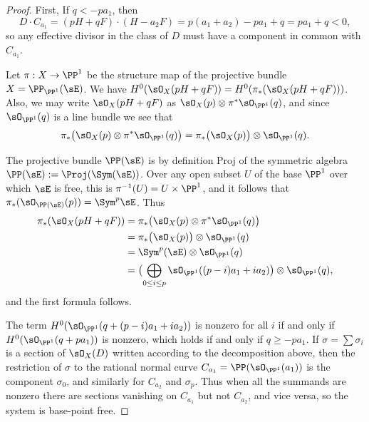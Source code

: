 \begin{proof} First, If $q<-pa_{1}$, then 
$$
D\cdot C_{a_{1}} = (pH+qF) \cdot (H-a_{2}F) = p(a_{1}+a_{2}) -pa_{1}+q = pa_{1}+q < 0,
$$
so any effective divisor in the class of $D$ must have a component in common with $C_{a_{1}}$.

Let $\pi:X\to \PP^{1}$ be the structure map of the projective bundle $X = \PP_{\PP^{1}}(\sE)$.
We have $H^{0}(\sO_{X}(pH+qF)) = H^{0}(\pi_{*}(\sO_{X}(pH+qF)))$. Also, 
we may write $\sO_{X}(pH+qF)$ as $\sO_{X}(p) \otimes \pi^{*}\sO_{\PP^{1}}(q)$, and since
$\sO_{\PP^{1}}(q)$ is a line bundle we see that 
$$
\pi_{*}\bigl(\sO_{X}(p) \otimes \pi^{*}\sO_{\PP^{1}}(q)\bigr) 
 = \pi_{*}\bigl(\sO_{X}(p)\bigr)\otimes \sO_{\PP^{1}}(q).
$$

The projective bundle $\PP(\sE)$ is
by definition Proj of the symmetric algebra $\PP(\sE):=\Proj(\Sym(\sE))$. Over any open 
subset $U$ of the base $\PP^1$ over which $\sE$ is free, this is $\pi^{-1}(U) = U\times \PP^1$,
and it follows that $\pi_*(\sO_{\PP(\sE)}(p)) = \Sym^p\sE$. 
Thus 
\begin{align*}
\pi_{*}(\sO_{X}(pH+qF)) &= 
\pi_{*}\bigl(\sO_{X}(p) \otimes \pi^{*}\sO_{\PP^{1}}(q)\bigr) \\
 &= \pi_{*}\bigl(\sO_{X}(p)\bigr)\otimes \sO_{\PP^{1}}(q)\\
&=  \Sym^{p}(\sE)\otimes \sO_{\PP^{1}}(q)\\
&=  \bigl(\bigoplus_{0\leq i\leq p} \sO_{\PP^{1}}((p-i)a_{1}+i a_{2})\bigr) \otimes \sO_{\PP^{1}}(q),
\end{align*}
and the first formula follows. 

The term 
$H^{0}(\sO_{\PP^{1}}(q + (p-i)a_{1}+i a_{2}))$ is nonzero for all $i$ if and only if 
$H^{0}(\sO_{\PP^{1}}(q + pa_{1}))$ is nonzero, which holds if and only if $q\geq -pa_{1}$.
If $\sigma = \sum \sigma_i$ is a section of $\sO_X(D)$ written according to the decomposition
above, then the restriction of $\sigma$ to  the rational normal curve $C_{a_1} = \PP(\sO_{\PP^1}(a_1))$ is the component $\sigma_0$, and similarly for $C_{a_2}$ and $\sigma_p$. Thus when  all the summands are nonzero
there are sections  vanishing on $C_{a_{1}}$ but not $C_{a_{2}}$, and vice versa, so the system is base-point free. 
\end{proof}




